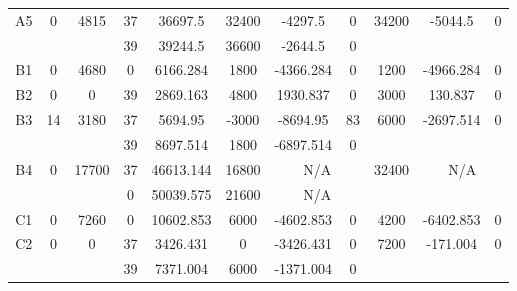 \begin{sidewaystable}
\begin{tabular}{c||c|c||c|c|c|c|c||c|c|c}
        
      \\
      \hline
      \multirow{2}{*}{A5} &
      \multirow{2}{*}{0} &
      \multirow{2}{*}{4815} &
      37 &
      36697.5 &
      32400 &
        -4297.5 &
        0 &
      \multirow{2}{*}{34200} &
        \multirow{2}{*}{-5044.5} &
        \multirow{2}{*}{0}
      \\
      \cline{4-8}
       &
       &
       &
      39 &
      39244.5 &
      36600 &
        -2644.5 &
        0 &
      
         &
        
      \\
      \hline
      \multirow{1}{*}{B1} &
      \multirow{1}{*}{0} &
      \multirow{1}{*}{4680} &
      0 &
      6166.284 &
      1800 &
        -4366.284 &
        0 &
      \multirow{1}{*}{1200} &
        \multirow{1}{*}{-4966.284} &
        \multirow{1}{*}{0}
      \\
      \hline
      \multirow{1}{*}{B2} &
      \multirow{1}{*}{0} &
      \multirow{1}{*}{0} &
      39 &
      2869.163 &
      4800 &
        1930.837 &
        0 &
      \multirow{1}{*}{3000} &
        \multirow{1}{*}{130.837} &
        \multirow{1}{*}{0}
      \\
      \hline
      \multirow{2}{*}{B3} &
      \multirow{2}{*}{14} &
      \multirow{2}{*}{3180} &
      37 &
      5694.95 &
      -3000 &
        -8694.95 &
        83 &
      \multirow{2}{*}{6000} &
        \multirow{2}{*}{-2697.514} &
        \multirow{2}{*}{0}
      \\
      \cline{4-8}
       &
       &
       &
      39 &
      8697.514 &
      1800 &
        -6897.514 &
        0 &
      
         &
        
      \\
      \hline
      \multirow{2}{*}{B4} &
      \multirow{2}{*}{0} &
      \multirow{2}{*}{17700} &
      37 &
      46613.144 &
      16800 &
        \multicolumn{2}{|c||}{N/A} &
      \multirow{2}{*}{32400} &
        \multicolumn{2}{c}{\multirow{2}{*}{N/A}}
      \\
      \cline{4-8}
       &
       &
       &
      0 &
      50039.575 &
      21600 &
        \multicolumn{2}{|c||}{N/A} &
      
        
      \\
      \hline
      \multirow{1}{*}{C1} &
      \multirow{1}{*}{0} &
      \multirow{1}{*}{7260} &
      0 &
      10602.853 &
      6000 &
        -4602.853 &
        0 &
      \multirow{1}{*}{4200} &
        \multirow{1}{*}{-6402.853} &
        \multirow{1}{*}{0}
      \\
      \hline
      \multirow{2}{*}{C2} &
      \multirow{2}{*}{0} &
      \multirow{2}{*}{0} &
      37 &
      3426.431 &
      0 &
        -3426.431 &
        0 &
      \multirow{2}{*}{7200} &
        \multirow{2}{*}{-171.004} &
        \multirow{2}{*}{0}
      \\
      \cline{4-8}
       &
       &
       &
      39 &
      7371.004 &
      6000 &
        -1371.004 &
        0 &
      

\end{tabular}
\end{sidewaystable}
